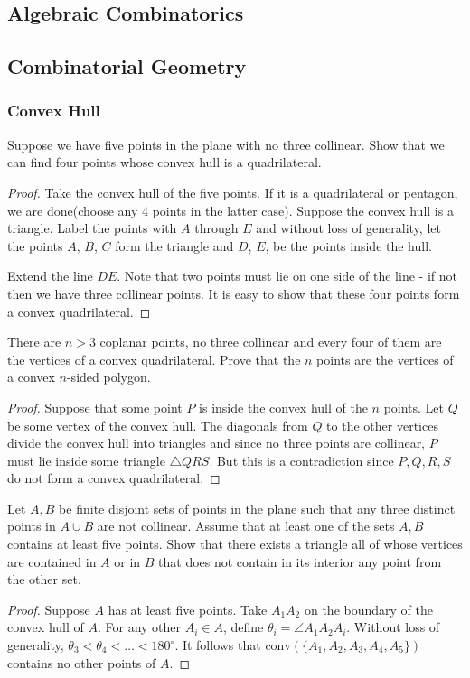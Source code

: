 \documentclass[11pt]{article}
\renewcommand{\>}{\rangle}
\newcommand{\<}{\langle}
\begin{document}
\subsection{Algebraic Combinatorics}

\subsection{Combinatorial Geometry}
\subsubsection{Convex Hull}
\begin{problem} Suppose we have five points in the plane with no three collinear.  Show that we can find four points whose convex hull is a quadrilateral.
\end{problem}
\begin{proof}
Take the convex hull of the five points.  If it is a quadrilateral or pentagon, we are done(choose any 4 points in the latter case).  Suppose the convex hull is a triangle.  Label the points with $A$ through $E$ and without loss of generality, let the points $A$, $B$, $C$ form the triangle and $D$, $E$, be the points inside the hull.

Extend the line $DE$.  Note that two points must lie on one side of the line - if not then we have three collinear points.  It is easy to show that these four points form a convex quadrilateral. 
\end{proof}
\begin{problem} There are $n > 3$ coplanar points, no three collinear and every four of them are the vertices of a convex quadrilateral.  Prove that the $n$ points are the vertices of a convex $n$-sided polygon.
\end{problem}
\begin{proof}
Suppose that some point $P$ is inside the convex hull of the $n$ points.  Let $Q$ be some vertex of the convex hull.  The diagonals from $Q$ to the other vertices divide the convex hull into triangles and since no three points are collinear, $P$ must lie inside some triangle $\triangle QRS$.  But this is a contradiction since $P, Q, R, S$ do not form a convex quadrilateral.
\end{proof}

\begin{problem} Let $A, B$ be finite disjoint sets of points in the plane such that any three distinct points in $A \cup B$ are not collinear.  Assume that at least one of the sets $A, B$ contains at least five points.  Show that there exists a triangle all of whose vertices are contained in $A$ or in $B$ that does not contain in its interior any point from the other set.
\end{problem}
\begin{proof}
Suppose $A$ has at least five points.  Take $A_1A_2$ on the boundary of the convex hull of $A$.  For any other $A_i \in A$, define $\theta_i = \angle A_1A_2A_i$.  Without loss of generality, $\theta_3 < \theta_4 < \dots < 180^\circ$.  It follows that $\text{conv}(\{A_1, A_2, A_3, A_4, A_5\})$ contains no other points of $A$.
\end{proof}
\end{document}
